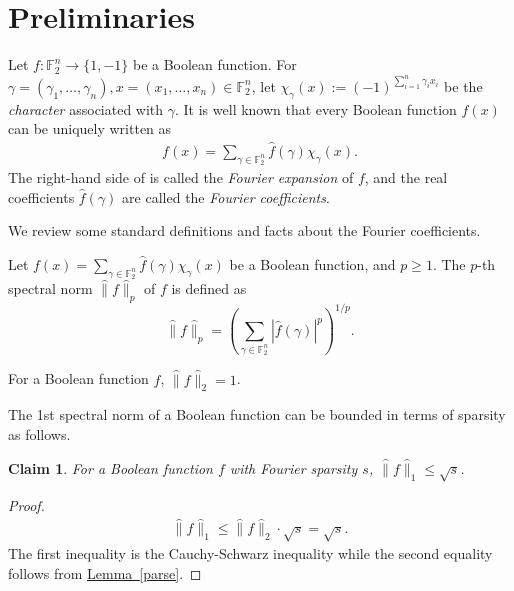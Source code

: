 \documentclass{toc}
\newcommand{\lref}[2][]{\hyperref[#2]{#1~\ref*{#2}}}
\newcommand{\F}{{\mathbb F}}
\newtheorem{clm}[theorem]{Claim}
\begin{document}
\section{Preliminaries}\label{sec:prelim}

Let $f:\F_2^n \rightarrow \{1,-1\}$ be a Boolean function. For $\gamma=(\gamma_1, \ldots, \gamma_n) , x=(x_1, \ldots, x_n) \in \F_2^n$, let $\chi_\gamma(x):=(-1)^{\sum_{i=1}^n \gamma_ix_i}$ be the \emph{character} associated with $\gamma$. It is well known that
every Boolean function $f(x)$
can be uniquely written as
\begin{align}f(x)=\sum_{\gamma \in \mathbb{F}_2^n}\widehat{f}(\gamma) \chi_\gamma(x).\label{FT}\end{align}
The right-hand side of  is called the \emph{Fourier expansion} of $f$, and the real coefficients $\widehat{f}(\gamma)$ are called the \emph{Fourier coefficients}.

We review some standard definitions and facts about the Fourier
coefficients.
\begin{definition}
Let $f(x)=\sum_{\gamma \in \mathbb{F}_2^n}\widehat{f}(\gamma) \chi_\gamma(x)$ be a Boolean function, and $p \geq 1$. The $p$-th spectral norm $\widehat{\|}f\widehat{\|}_p$ of $f$ is defined as %
\[\widehat{\|}f\widehat{\|}_p=\left(\sum_{\gamma \in \mathbb{F}_2^n} \left|\widehat{f}(\gamma)\right|^p\right)^{1/p}.\]

\end{definition}

\begin{lemma}
\label{parse}
 For a Boolean function $f$, $\widehat{\|}f\widehat{\|}_2 = 1$.
\end{lemma}
The 1st spectral norm of a Boolean function can be bounded in terms of sparsity as follows.
\begin{clm}
\label{claim:lonespar}
For a Boolean function $f$ with Fourier sparsity $s$, $\widehat{\|}f\widehat{\|}_1 \leq \sqrt{s}$.
\end{clm}
\begin{proof}
\begin{align*}
\widehat{\|}f\widehat{\|}_1  \leq \widehat{\|}f\widehat{\|}_2 \cdot \sqrt{s}   = \sqrt{s}.
\end{align*}
The first inequality is the Cauchy-Schwarz inequality while the
second equality follows from \lref[Lemma]{parse}.
\end{proof}
\end{document}
